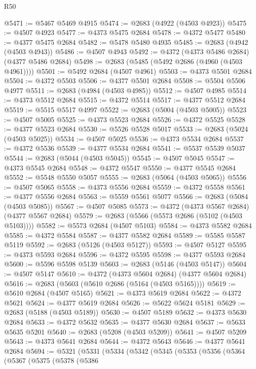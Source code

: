 \begin{lexlean}{R50}
\begin{coremodule}
@5471 := @5467 @5469 @4915
@5474 := @2683 (@4922 (@4503 @4923))
@5475 := @4507 @4923
@5477 := @4373 @5475 @2684
@5478 := @4372 @5477
@5480 := @4377 @5475 @2684
@5482 := @5478 @5480 @4935
@5485 := @2683 (@4942 (@4503 @4943))
@5486 := @4507 @4943
@5492 := @4372 (@4373 @5486 @2684) (@4377 @5486 @2684)
@5498 := @2683 (@5485 (@5492 @2686 (@4960 (@4503 @4961))))
@5501 := @5492 @2684 (@4507 @4961)
@5503 := @4373 @5501 @2684
@5504 := @4372 @5503
@5506 := @4377 @5501 @2684
@5508 := @5504 @5506 @4977
@5511 := @2683 (@4984 (@4503 @4985))
@5512 := @4507 @4985
@5514 := @4373 @5512 @2684
@5515 := @4372 @5514
@5517 := @4377 @5512 @2684
@5519 := @5515 @5517 @4997
@5522 := @2683 (@5004 (@4503 @5005))
@5523 := @4507 @5005
@5525 := @4373 @5523 @2684
@5526 := @4372 @5525
@5528 := @4377 @5523 @2684
@5530 := @5526 @5528 @5017
@5533 := @2683 (@5024 (@4503 @5025))
@5534 := @4507 @5025
@5536 := @4373 @5534 @2684
@5537 := @4372 @5536
@5539 := @4377 @5534 @2684
@5541 := @5537 @5539 @5037
@5544 := @2683 (@5044 (@4503 @5045))
@5545 := @4507 @5045
@5547 := @4373 @5545 @2684
@5548 := @4372 @5547
@5550 := @4377 @5545 @2684
@5552 := @5548 @5550 @5057
@5555 := @2683 (@5064 (@4503 @5065))
@5556 := @4507 @5065
@5558 := @4373 @5556 @2684
@5559 := @4372 @5558
@5561 := @4377 @5556 @2684
@5563 := @5559 @5561 @5077
@5566 := @2683 (@5084 (@4503 @5085))
@5567 := @4507 @5085
@5573 := @4372 (@4373 @5567 @2684) (@4377 @5567 @2684)
@5579 := @2683 (@5566 (@5573 @2686 (@5102 (@4503 @5103))))
@5582 := @5573 @2684 (@4507 @5103)
@5584 := @4373 @5582 @2684
@5585 := @4372 @5584
@5587 := @4377 @5582 @2684
@5589 := @5585 @5587 @5119
@5592 := @2683 (@5126 (@4503 @5127))
@5593 := @4507 @5127
@5595 := @4373 @5593 @2684
@5596 := @4372 @5595
@5598 := @4377 @5593 @2684
@5600 := @5596 @5598 @5139
@5603 := @2683 (@5146 (@4503 @5147))
@5604 := @4507 @5147
@5610 := @4372 (@4373 @5604 @2684) (@4377 @5604 @2684)
@5616 := @2683 (@5603 (@5610 @2686 (@5164 (@4503 @5165))))
@5619 := @5610 @2684 (@4507 @5165)
@5621 := @4373 @5619 @2684
@5622 := @4372 @5621
@5624 := @4377 @5619 @2684
@5626 := @5622 @5624 @5181
@5629 := @2683 (@5188 (@4503 @5189))
@5630 := @4507 @5189
@5632 := @4373 @5630 @2684
@5633 := @4372 @5632
@5635 := @4377 @5630 @2684
@5637 := @5633 @5635 @5201
@5640 := @2683 (@5208 (@4503 @5209))
@5641 := @4507 @5209
@5643 := @4373 @5641 @2684
@5644 := @4372 @5643
@5646 := @4377 @5641 @2684
@5694 := @5321
    (@5331
      (@5334
        (@5342
          (@5345
            (@5353
              (@5356
                (@5364
                  (@5367
                    (@5375
                      (@5378
                        (@5386

\end{coremodule}
\end{lexlean}
